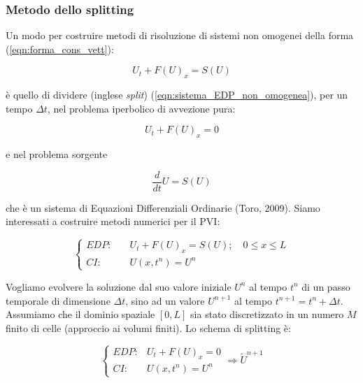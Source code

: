 \documentclass[12pt]{article} %
\begin{document}
\subsubsection{Metodo dello splitting}

\noindent Un modo per costruire metodi di risoluzione di sistemi non omogenei della forma (\ref{eqn:forma_cons_vett}):

\begin{equation}
    U_t+F(U)_x=S(U)
    \label{eqn:sistema_EDP_non_omogenea}
\end{equation}

\noindent è quello di dividere (inglese \textit{split}) (\ref{eqn:sistema_EDP_non_omogenea}), per un tempo $\Delta t$, nel problema iperbolico di avvezione pura:

\begin{equation}
    U_t+F(U)_x = 0
    \label{eqn:avvezione_pura}
\end{equation}

\noindent e nel problema sorgente

\begin{equation}
    \frac{d}{dt}U = S(U)
    \label{eqn:sorgente}
\end{equation}

\noindent che è un sistema di Equazioni Differenziali Ordinarie (Toro, 2009).
Siamo interessati a costruire metodi numerici per il PVI:

\begin{equation}
    \begin{cases} EDP:\quad &U_t+F(U)_x = S(U);\quad 0\leq x \leq L\\
    CI: &U(x,t^n)=U^n
    \end{cases}
    \label{eqn:PVI_completo}
\end{equation}

\noindent Vogliamo evolvere la soluzione dal suo valore iniziale $U^n$ al tempo $t^n$ di un passo temporale di dimensione $\Delta t$, sino ad un valore $U^{n+1}$ al tempo $t^{n+1} = t^n + \Delta t$. Assumiamo che il dominio spaziale $[0, L]$ sia stato discretizzato in un numero $M$ finito di celle (approccio ai volumi finiti). Lo schema di splitting è:

\begin{equation}
    \left\{\begin{array}{lr}
        EDP: & U_t+F(U)_x = 0\\
        CI: & U(x,t^n)=U^n
        \end{array}
    \right. \Longrightarrow \tilde{U}^{n+1}
    \label{eqn:PVI_avvettivo}
\end{equation}
\end{document}

